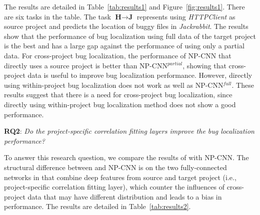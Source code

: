 The results are detailed in Table~\ref{tab:results1} and Figure~\ref{fig:results1}. There are six tasks in the table.%
The task $\textbf{H} \rightarrow \textbf{J}$ represents using \textit{HTTPClient} as source project and predicts the location of buggy files in \textit{Jackrabbit}. The results show that the performance of bug localization using full data of the target project is the best and has a large gap against the performance of using only a partial data. For cross-project bug localization, the performance of NP-CNN that directly uses a source project is better than NP-CNN$^{partial}$, showing that cross-project data is useful to improve bug localization performance. However, directly using within-project bug localization does not work as well as NP-CNN$^{full}$. These results suggest that there is a need for cross-project bug localization, since directly using within-project bug localization method does not show a good performance.

\textbf{RQ2}: \textit{Do the project-specific correlation fitting layers improve the bug localization performance?}

To answer this research question, we compare the results of \TRANPCNN with NP-CNN. The structural difference between \TRANPCNN and NP-CNN is on the two fully-connected networks in \TRANPCNN that combine deep features from source and target project (i.e., project-specific correlation fitting layer), which counter the influences of cross-project data that may have different distribution and leads to a bias in performance. The results are detailed in Table~\ref{tab:results2}.


